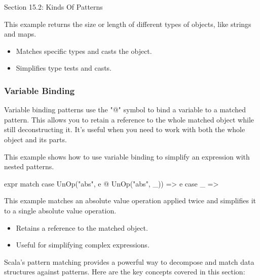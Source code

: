 \begin{notes}{Section 15.2: Kinds Of Patterns}
\begin{highlight}
    This example returns the size or length of different types of objects, like strings and maps.
    
    \begin{itemize}
        \item Matches specific types and casts the object.
        \item Simplifies type tests and casts.
    \end{itemize}
    
    \end{highlight}
    
    \subsubsection*{Variable Binding}
    
    Variable binding patterns use the "@" symbol to bind a variable to a matched pattern. This allows you to retain a reference to the whole matched object while still deconstructing it. It's useful 
    when you need to work with both the whole object and its parts.
    
    \begin{highlight}
    
    This example shows how to use variable binding to simplify an expression with nested patterns.
    
    \begin{code}[Scala]
    expr match {
        case UnOp("abs", e @ UnOp("abs", _)) => e
        case _ =>
    }
    \end{code}
    
    This example matches an absolute value operation applied twice and simplifies it to a single absolute value operation.
    
    \begin{itemize}
        \item Retains a reference to the matched object.
        \item Useful for simplifying complex expressions.
    \end{itemize}
    
    \end{highlight}
    
    \begin{highlight}
    
    Scala's pattern matching provides a powerful way to decompose and match data structures against patterns. Here are the key concepts covered in this section:
    

\end{highlight}
\end{notes}
